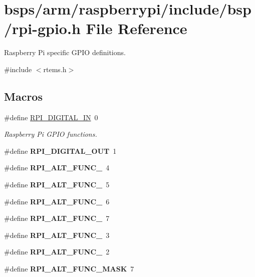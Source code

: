 \hypertarget{rpi-gpio_8h}{}\section{bsps/arm/raspberrypi/include/bsp/rpi-\/gpio.h File Reference}
\label{rpi-gpio_8h}


Raspberry Pi specific G\+P\+IO definitions.  


{\ttfamily \#include $<$rtems.\+h$>$}\newline
\subsection*{Macros}
\begin{DoxyCompactItemize}
\item 
\mbox{\label{rpi-gpio_8h_a48cbbed136547bef8034d6e536f094fd}} 
\#define \mbox{\hyperlink{rpi-gpio_8h_a48cbbed136547bef8034d6e536f094fd}{R\+P\+I\+\_\+\+D\+I\+G\+I\+T\+A\+L\+\_\+\+IN}}~0
\begin{DoxyCompactList}\small\item\em Raspberry Pi G\+P\+IO functions. \end{DoxyCompactList}\item 
\mbox{\label{rpi-gpio_8h_aad5c9e03c884ee7e499606ca66ae9fb4}} 
\#define {\bfseries R\+P\+I\+\_\+\+D\+I\+G\+I\+T\+A\+L\+\_\+\+O\+UT}~1
\item 
\mbox{\label{rpi-gpio_8h_aee526cc04641b9ca915d34263ee9a16a}} 
\#define {\bfseries R\+P\+I\+\_\+\+A\+L\+T\+\_\+\+F\+U\+N\+C\+\_}~4
\item 
\mbox{\label{rpi-gpio_8h_a49d66934c08bf5e9e2176c92d00dcce6}} 
\#define {\bfseries R\+P\+I\+\_\+\+A\+L\+T\+\_\+\+F\+U\+N\+C\+\_}~5
\item 
\mbox{\label{rpi-gpio_8h_a9d23f0fafc9424bcf30f275f7b702824}} 
\#define {\bfseries R\+P\+I\+\_\+\+A\+L\+T\+\_\+\+F\+U\+N\+C\+\_}~6
\item 
\mbox{\label{rpi-gpio_8h_ae1edad14d7b087cc3f53496a3bd416d0}} 
\#define {\bfseries R\+P\+I\+\_\+\+A\+L\+T\+\_\+\+F\+U\+N\+C\+\_}~7
\item 
\mbox{\label{rpi-gpio_8h_afb5170cf5f14f66bb435e9f269bca217}} 
\#define {\bfseries R\+P\+I\+\_\+\+A\+L\+T\+\_\+\+F\+U\+N\+C\+\_}~3
\item 
\mbox{\label{rpi-gpio_8h_ada342d39c713395b01e588bf01888dcb}} 
\#define {\bfseries R\+P\+I\+\_\+\+A\+L\+T\+\_\+\+F\+U\+N\+C\+\_}~2
\item 
\mbox{\label{rpi-gpio_8h_a65a6d607b60ac6b9863da6a8f241a526}} 
\#define {\bfseries R\+P\+I\+\_\+\+A\+L\+T\+\_\+\+F\+U\+N\+C\+\_\+\+M\+A\+SK}~7
\end{DoxyCompactItemize}

